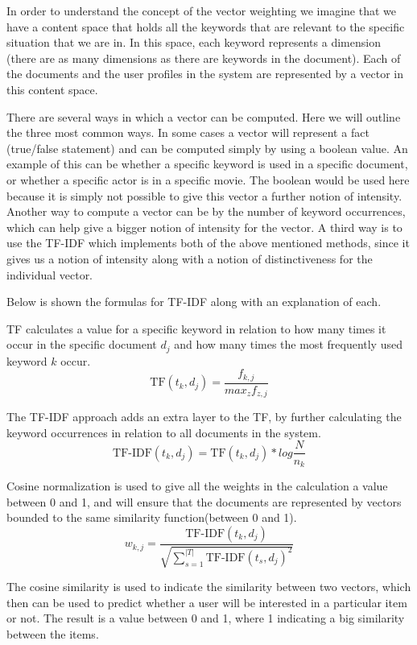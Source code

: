 In order to understand the concept of the vector weighting we imagine that we have a content space that holds all the keywords that are relevant to the specific situation that we are in. In this space, each keyword represents a dimension (there are as many dimensions as there are keywords in the document). Each of the documents and the user profiles in the system are represented by a vector in this content space.

There are several ways in which a vector can be computed. Here we will outline the three most common ways.
In some cases a vector will represent a fact (true/false statement) and can be computed simply by using a boolean value. An example of this can be whether a specific keyword is used in a specific document, or whether a specific actor is in a specific movie. The boolean would be used here because it is simply not possible to give this vector a further notion of intensity.\newline
Another way to compute a vector can be by the number of keyword occurrences, which can help give a bigger notion of intensity for the vector.\newline
A third way is to use the TF-IDF which implements both of the above mentioned methods, since it gives us a notion of intensity along with a notion of distinctiveness for the individual vector.\newline

Below is shown the formulas for TF-IDF along with an explanation of each.

TF calculates a value for a specific keyword in relation to how many times it occur in the specific document \(d_{j}\) and how many times the most frequently used keyword \(k\) occur.
\[
	\text{TF}(t_{k},d_{j}) = \frac{f_{k,j}}{max_{z}f_{z,j}}
\]

The TF-IDF approach adds an extra layer to the TF, by further calculating the keyword occurrences in relation to all documents in the system.
\[
	\text{TF-IDF}(t_{k},d_{j}) = \text{TF}(t_{k},d_{j}) * log{\frac{N}{n_{k}}}
\]

Cosine normalization is used to give all the weights in the calculation a value between 0 and 1, and will ensure that the documents are represented by vectors bounded to the same similarity function(between 0 and 1).
\[
	w_{k,j} = \frac{\text{TF-IDF}(t_{k},d_{j})}{\sqrt{\sum_{s=1}^{|T|} \text{TF-IDF}(t_{s}, d_{j})^2}}
\]

The cosine similarity is used to indicate the similarity between two vectors, which then can be used to predict whether a user will be interested in a particular item or not. The result is a value between 0 and 1, where 1 indicating a big similarity between the items.


